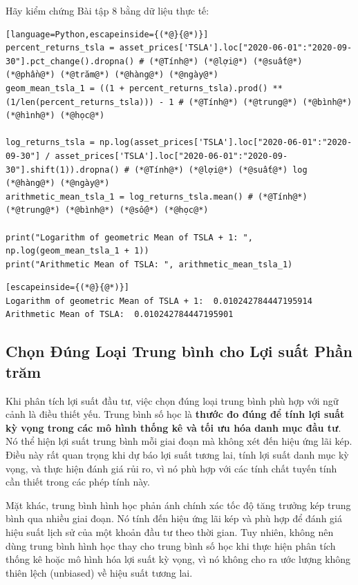 Hãy kiểm chứng Bài tập 8 bằng dữ liệu thực tế:

\begin{lstlisting}[language=Python,escapeinside={(*@}{@*)}]
percent_returns_tsla = asset_prices['TSLA'].loc["2020-06-01":"2020-09-30"].pct_change().dropna() # (*@Tính@*) (*@lợi@*) (*@suất@*) (*@phần@*) (*@trăm@*) (*@hàng@*) (*@ngày@*)
geom_mean_tsla_1 = ((1 + percent_returns_tsla).prod() ** (1/len(percent_returns_tsla))) - 1 # (*@Tính@*) (*@trung@*) (*@bình@*) (*@hình@*) (*@học@*)

log_returns_tsla = np.log(asset_prices['TSLA'].loc["2020-06-01":"2020-09-30"] / asset_prices['TSLA'].loc["2020-06-01":"2020-09-30"].shift(1)).dropna() # (*@Tính@*) (*@lợi@*) (*@suất@*) log (*@hàng@*) (*@ngày@*)
arithmetic_mean_tsla_1 = log_returns_tsla.mean() # (*@Tính@*) (*@trung@*) (*@bình@*) (*@số@*) (*@học@*)

print("Logarithm of geometric Mean of TSLA + 1: ", np.log(geom_mean_tsla_1 + 1))
print("Arithmetic Mean of TSLA: ", arithmetic_mean_tsla_1)
\end{lstlisting}

\begin{lstlisting}[escapeinside={(*@}{@*)}]
Logarithm of geometric Mean of TSLA + 1:  0.010242784447195914
Arithmetic Mean of TSLA:  0.010242784447195901
\end{lstlisting}

\subsection{Chọn Đúng Loại Trung bình cho Lợi suất Phần trăm}

Khi phân tích lợi suất đầu tư, việc chọn đúng loại trung bình phù hợp với ngữ cảnh là điều thiết yếu. Trung bình số học là \textbf{thước đo đúng để tính lợi suất kỳ vọng trong các mô hình thống kê và tối ưu hóa danh mục đầu tư}. Nó thể hiện lợi suất trung bình mỗi giai đoạn mà không xét đến hiệu ứng lãi kép. Điều này rất quan trọng khi dự báo lợi suất tương lai, tính lợi suất danh mục kỳ vọng, và thực hiện đánh giá rủi ro, vì nó phù hợp với các tính chất tuyến tính cần thiết trong các phép tính này.

Mặt khác, trung bình hình học phản ánh chính xác tốc độ tăng trưởng kép trung bình qua nhiều giai đoạn. Nó tính đến hiệu ứng lãi kép và phù hợp để đánh giá hiệu suất lịch sử của một khoản đầu tư theo thời gian. Tuy nhiên, không nên dùng trung bình hình học thay cho trung bình số học khi thực hiện phân tích thống kê hoặc mô hình hóa lợi suất kỳ vọng, vì nó không cho ra ước lượng không thiên lệch (unbiased) về hiệu suất tương lai.

